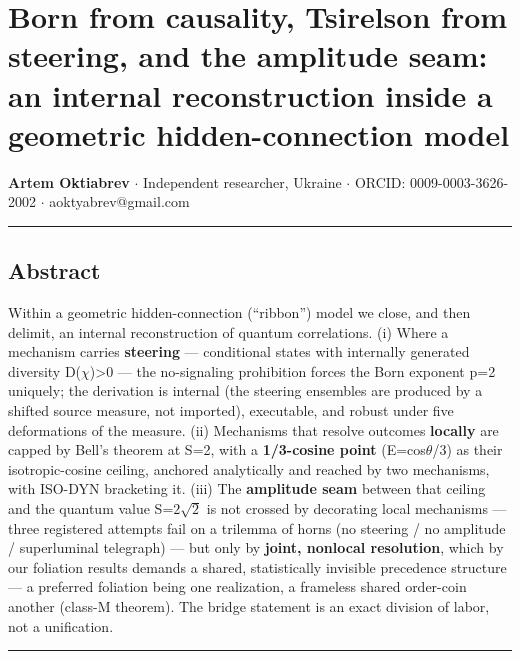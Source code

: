 \documentclass[
  11pt]{article}
\author{}
\date{}
\begin{document}
\section{Born from causality, Tsirelson from steering, and the amplitude
seam: an internal reconstruction inside a geometric hidden-connection
model}\label{born-from-causality-tsirelson-from-steering-and-the-amplitude-seam-an-internal-reconstruction-inside-a-geometric-hidden-connection-model}

\textbf{Artem Oktiabrev} $\cdot$ Independent researcher, Ukraine $\cdot$ ORCID:
0009-0003-3626-2002 $\cdot$ aoktyabrev@gmail.com

\begin{center}\rule{0.5\linewidth}{0.5pt}\end{center}

\subsection{Abstract}\label{abstract}

Within a geometric hidden-connection (``ribbon'') model we close, and
then delimit, an internal reconstruction of quantum correlations. (i)
Where a mechanism carries \textbf{steering} --- conditional states with
internally generated diversity D($\chi$)\textgreater0 --- the no-signaling
prohibition forces the Born exponent p=2 uniquely; the derivation is
internal (the steering ensembles are produced by a shifted source
measure, not imported), executable, and robust under five deformations
of the measure. (ii) Mechanisms that resolve outcomes \textbf{locally}
are capped by Bell's theorem at S=2, with a \textbf{1/3-cosine point}
(E=cos$\theta$/3) as their isotropic-cosine ceiling, anchored analytically and
reached by two mechanisms, with ISO-DYN bracketing it. (iii) The
\textbf{amplitude seam} between that ceiling and the quantum value S=$2\sqrt{2}$
is not crossed by decorating local mechanisms --- three registered
attempts fail on a trilemma of horns (no steering / no amplitude /
superluminal telegraph) --- but only by \textbf{joint, nonlocal
resolution}, which by our foliation results demands a shared,
statistically invisible precedence structure --- a preferred foliation
being one realization, a frameless shared order-coin another (class-M
theorem). The bridge statement is an exact division of labor, not a
unification.

\begin{center}\rule{0.5\linewidth}{0.5pt}\end{center}
\end{document}
